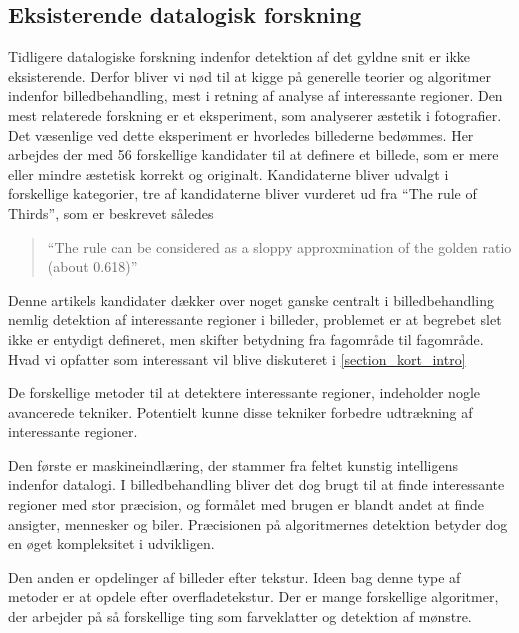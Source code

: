 {\subsection{Eksisterende datalogisk forskning}
Tidligere datalogiske forskning indenfor detektion af det gyldne snit er
ikke eksisterende. Derfor bliver vi nød til at kigge på generelle teorier og algoritmer
indenfor billedbehandling, mest i retning af  analyse af interessante
regioner. Den mest relaterede forskning er et eksperiment, som
analyserer æstetik i fotografier\cite{DattaWang}.
Det væsenlige ved dette eksperiment er hvorledes billederne
bedømmes. Her arbejdes der med 56 forskellige kandidater til at definere
et billede, som er mere eller mindre æstetisk korrekt og originalt. 
Kandidaterne bliver udvalgt i forskellige kategorier, tre af
kandidaterne bliver vurderet ud fra ``The rule of Thirds'', som er
beskrevet således
\begin{quote}
	``The rule can be considered as a sloppy approxmination of the
	golden ratio (about 0.618)''
\end{quote}

Denne artikels kandidater dækker over noget ganske centralt i
billedbehandling nemlig detektion af
interessante regioner i billeder, problemet er at begrebet slet ikke er
entydigt defineret, men skifter betydning fra fagområde til fagområde.
Hvad vi opfatter som interessant vil blive diskuteret i \ref{section_kort_intro}

De forskellige metoder til at detektere interessante regioner, indeholder nogle avancerede tekniker.
Potentielt kunne disse tekniker forbedre udtrækning af interessante regioner.

Den første er maskineindlæring, der stammer fra feltet kunstig
intelligens indenfor datalogi. I billedbehandling bliver det dog
brugt til at finde interessante regioner med stor præcision, og formålet
med brugen er blandt andet at finde ansigter, mennesker og
biler\cite{ViolaJones01,SchneidermanKanade00,Gabor}. Præcisionen på
algoritmernes detektion betyder dog en øget kompleksitet i udvikligen. 

Den anden er opdelinger af billeder efter tekstur. Ideen bag denne type
af metoder er at opdele efter
overfladetekstur\cite{218442,CarsonBelongie02,PapageorgiouPoggio}.
Der er mange forskellige algoritmer, der arbejder på så forskellige ting
som farveklatter og detektion af mønstre\cite{PalPal}.

}
